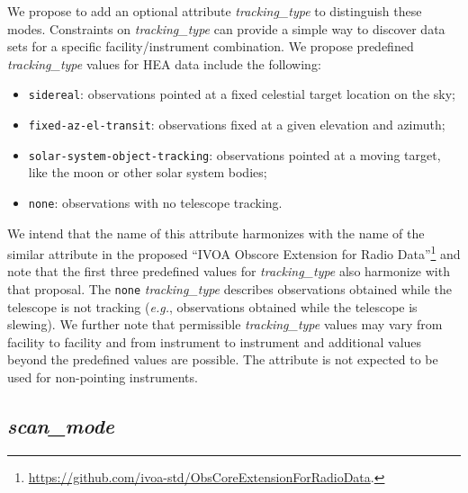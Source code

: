 \documentclass[11pt,a4paper]{ivoa}
\begin{document}
We propose to add an optional attribute {\em tracking\_type\/} to distinguish these modes.  Constraints on {\em tracking\_type\/} can provide a simple way to discover data sets for a specific facility/instrument combination.  We propose predefined {\em tracking\_type\/} values for \gls{HEA} data include the following:
\begin{itemize}
	\item \texttt{sidereal}: observations pointed at a fixed celestial target location on the sky;
	\item \texttt{fixed-az-el-transit}: observations fixed at a given elevation and azimuth;
	\item \texttt{solar-system-object-tracking}: observations pointed at a moving target, like the moon or other solar system bodies;
	\item \texttt{none}: observations with no telescope tracking.
\end{itemize}
We intend that the name of this attribute harmonizes with the name of the similar attribute in the proposed ``IVOA Obscore Extension for Radio Data''\footnote{\url{https://github.com/ivoa-std/ObsCoreExtensionForRadioData}.} and note that the first three predefined values for {\em tracking\_type\/} also harmonize with that proposal.  The \texttt{none} {\em tracking\_type\/} describes observations obtained while the telescope is not tracking ({\em e.g.\/}, observations obtained while the telescope is slewing). We further note that permissible {\em tracking\_type\/} values may vary from facility to facility and from instrument to instrument and additional values beyond the predefined values are possible. The attribute is not expected to be used for non-pointing instruments.

\subsection{{\em scan\_mode}}
\end{document}
